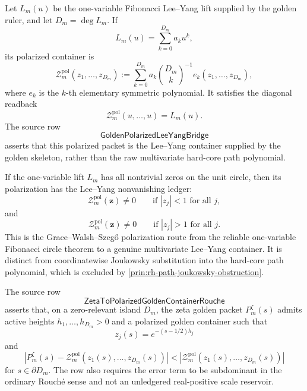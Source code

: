 \begin{definition}
\label{def:rh-polarized-golden-lee-yang-container}
Let $L_m(u)$ be the one-variable Fibonacci Lee--Yang lift supplied by
the golden ruler, and let $D_m=\deg L_m$.  If
$$
L_m(u)=\sum_{k=0}^{D_m}a_k u^k,
$$
its polarized container is
$$
\mathcal Z_m^{\mathrm{pol}}(z_1,\ldots,z_{D_m})
:=
\sum_{k=0}^{D_m}
a_k
\binom{D_m}{k}^{-1}
e_k(z_1,\ldots,z_{D_m}),
$$
where $e_k$ is the $k$-th elementary symmetric polynomial.  It satisfies
the diagonal readback
$$
\mathcal Z_m^{\mathrm{pol}}(u,\ldots,u)=L_m(u).
$$
The source row
$$
\mathsf{GoldenPolarizedLeeYangBridge}
$$
asserts that this polarized packet is the Lee--Yang container supplied
by the golden skeleton, rather than the raw multivariate hard-core path
polynomial.
\end{definition}

\begin{principle}
\label{prin:rh-polarization-supplies-container-row}
If the one-variable lift $L_m$ has all nontrivial zeros on the unit
circle, then its polarization has the Lee--Yang nonvanishing ledger:
$$
\mathcal Z_m^{\mathrm{pol}}(\mathbf z)\ne0
\qquad
\text{if } |z_j|<1\text{ for all }j,
$$
and
$$
\mathcal Z_m^{\mathrm{pol}}(\mathbf z)\ne0
\qquad
\text{if } |z_j|>1\text{ for all }j.
$$
This is the Grace--Walsh--Szegő polarization route from the reliable
one-variable Fibonacci circle theorem to a genuine multivariate
Lee--Yang container.  It is distinct from coordinatewise Joukowsky
substitution into the hard-core path polynomial, which is excluded by
\autoref{prin:rh-path-joukowsky-obstruction}.
\end{principle}

\begin{definition}
\label{def:rh-zeta-to-polarized-golden-container-rouche}
The source row
$$
\mathsf{ZetaToPolarizedGoldenContainerRouche}
$$
asserts that, on a zero-relevant island $D_m$, the zeta golden packet
$P_m^{\zeta}(s)$ admits active heights $h_1,\ldots,h_{D_m}>0$ and a
polarized golden container such that
$$
z_j(s)=e^{-(s-1/2)h_j}
$$
and
$$
\left|
P_m^{\zeta}(s)-
\mathcal Z_m^{\mathrm{pol}}(z_1(s),\ldots,z_{D_m}(s))
\right|
<
\left|
\mathcal Z_m^{\mathrm{pol}}(z_1(s),\ldots,z_{D_m}(s))
\right|
$$
for $s\in\partial D_m$.  The row also requires the error term to be
subdominant in the ordinary Rouch\'e sense and not an unledgered
real-positive scale reservoir.
\end{definition}

